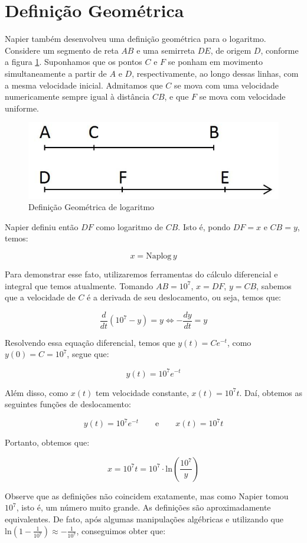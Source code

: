 \section{Definição Geométrica}

Napier também desenvolveu uma definição geométrica para o logaritmo. 
Considere um segmento de reta $AB$ e uma semirreta $DE$, de origem $D$, conforme a figura \ref{fig:defgeolog}. 
Suponhamos que os pontos $C$ e $F$ se ponham em movimento simultaneamente a partir de $A$ e $D$, respectivamente, 
ao longo dessas linhas, com a mesma velocidade inicial. 
Admitamos que $C$ se mova com uma velocidade numericamente sempre igual à distância $CB$, 
e que $F$ se mova com velocidade uniforme. 

\begin{figure}[h!]
    \centering
    \includegraphics[width=0.4\linewidth]{img/defgeo.png}
    \caption{Definição Geométrica de logaritmo}
    \label{fig:defgeolog}
\end{figure}

Napier definiu então $DF$ como logaritmo de $CB$. 
Isto é, pondo $DF = x$ e $CB = y$, temos:

\[
x = \text{Naplog}\, y
\]

Para demonstrar esse fato, utilizaremos ferramentas do cálculo diferencial e integral que temos atualmente. Tomando $AB = 10^7$, $x=DF$, $y = CB$, sabemos que a velocidade de $C$ é a derivada de seu deslocamento, ou seja, temos que:

\[
\dfrac{d}{dt}(10^7 - y) = y \iff -\dfrac{dy}{dt} = y
\]

Resolvendo essa equação diferencial, temos que $y(t) = Ce^{-t}$, como $y(0) = C = 10^7$, segue que:

\[
y(t) = 10^7 e^{-t}
\]

Além disso, como $x(t)$ tem velocidade constante, $x(t)= 10^7 t$. Daí, obtemos as seguintes funções de deslocamento:

\[
y(t) = 10^7 e^{-t} \qquad \text{e} \qquad x(t)= 10^7 t
\]

Portanto, obtemos que:

\[
x = 10^7 t = 10^7 \cdot \text{ln}\left(\frac{10^7}{y}\right)
\]

Observe que as definições não coincidem exatamente, mas como Napier tomou $10^7$, isto é, um número muito grande. As definições são aproximadamente equivalentes. De fato, após algumas manipulações algébricas e utilizando que $\text{ln}\left(1-\frac{1}{10^7}\right) \approx -\frac{1}{10^7}$, conseguimos obter que:

